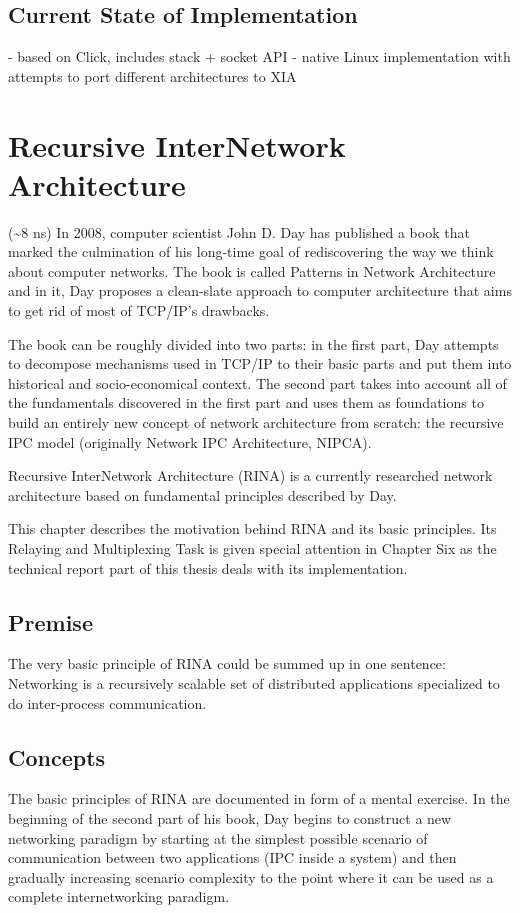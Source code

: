        \subsection{Current State of Implementation}
            - based on Click, includes stack + socket API
            - native Linux implementation with attempts to port different architectures to XIA


    \section{Recursive InterNetwork Architecture}
        (\textasciitilde8 ns)
        In 2008, computer scientist John D. Day has published a book that marked the culmination of his long-time goal of rediscovering the way we think about computer networks. The book is called Patterns in Network Architecture and in it, Day proposes a clean-slate approach to computer architecture that aims to get rid of most of TCP/IP's drawbacks.

        The book can be roughly divided into two parts: in the first part, Day attempts to decompose mechanisms used in TCP/IP to their basic parts and put them into historical and socio-economical context. The second part takes into account all of the fundamentals discovered in the first part and uses them as foundations to build an entirely new concept of network architecture from scratch: the recursive IPC model (originally Network IPC Architecture, NIPCA).

        Recursive InterNetwork Architecture (RINA) is a currently researched network architecture based on fundamental principles described by Day.

        This chapter describes the motivation behind RINA and its basic principles. Its Relaying and Multiplexing Task is given special attention in Chapter Six as the technical report part of this thesis deals with its implementation.

        \subsection{Premise}
            The very basic principle of RINA could be summed up in one sentence: Networking is a recursively scalable set of distributed applications specialized to do inter-process communication.

        \subsection{Concepts}
            The basic principles of RINA are documented in form of a mental exercise. In the beginning of the second part of his book, Day begins to construct a new networking paradigm by starting at the simplest possible scenario of communication between two applications (IPC inside a system) and then gradually increasing scenario complexity to the point where it can be used as a complete internetworking paradigm.

